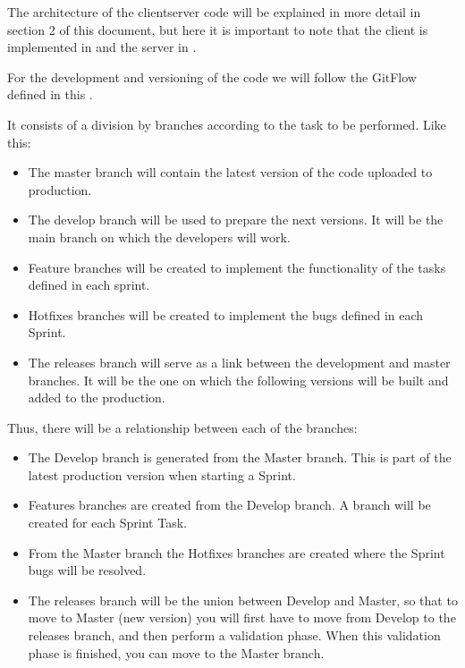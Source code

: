 \documentclass[letterpaper,10pt,english]{sphinxmanual}
\begin{document}
The architecture of the client\sphinxhyphen{}server code will be explained in more detail in section 2 of this document, but here it is important to note that the client is implemented in  and the server in .

For the development and versioning of the code we will follow the GitFlow defined in this .



It consists of a division by branches according to the task to be performed. Like this:
\begin{itemize}
\item {} 
The master branch will contain the latest version of the code uploaded to production.

\item {} 
The develop branch will be used to prepare the next versions. It will be the main branch on which the developers will work.

\item {} 
Feature branches will be created to implement the functionality of the tasks defined in each sprint.

\item {} 
Hotfixes branches will be created to implement the bugs defined in each Sprint.

\item {} 
The releases branch will serve as a link between the development and master branches. It will be the one on which the following versions will be built and added to the production.

\end{itemize}

Thus, there will be a relationship between each of the branches:
\begin{itemize}
\item {} 
The Develop branch is generated from the Master branch. This is part of the latest production version when starting a Sprint.

\item {} 
Features branches are created from the Develop branch. A branch will be created for each Sprint Task.

\item {} 
From the Master branch the Hotfixes branches are created where the Sprint bugs will be resolved.

\item {} 
The releases branch will be the union between Develop and Master, so that to move to Master (new version) you will first have to move from Develop to the releases branch, and then perform a validation phase. When this validation phase is finished, you can move to the Master branch.

\end{itemize}
\end{document}
